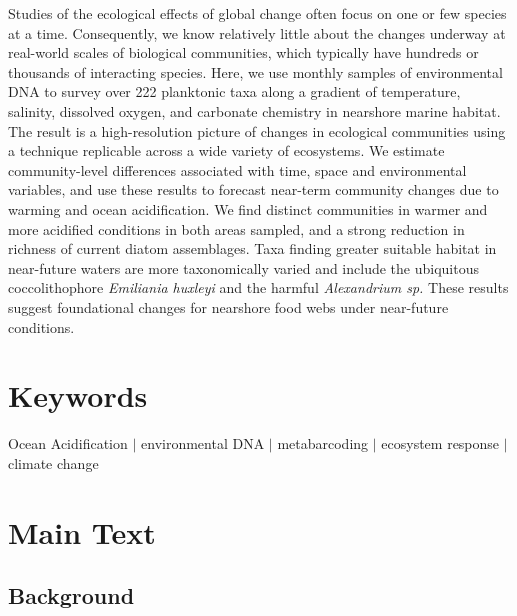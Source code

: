\documentclass[11pt]{article}
\begin{document}
\begin{linenumbers}
Studies of the ecological effects of global change often focus on one or few species at a time. Consequently, we know relatively little about the changes underway at real-world scales of biological communities, which typically have hundreds or thousands of interacting species. Here, we use monthly samples of environmental DNA to survey over 222 planktonic taxa along a gradient of temperature, salinity, dissolved oxygen, and carbonate chemistry in nearshore marine habitat. The result is a high-resolution picture of changes in ecological communities using a technique replicable across a wide variety of ecosystems. We estimate community-level differences associated with time, space and environmental variables, and use these results to forecast near-term community changes due to warming and ocean acidification. We find distinct communities in warmer and more acidified conditions in both areas sampled, and a strong reduction in richness of current diatom assemblages. Taxa finding greater suitable habitat in near-future waters are more taxonomically varied and include the ubiquitous coccolithophore \textit{Emiliania huxleyi} and the harmful \textit{Alexandrium sp.} These results suggest foundational changes for nearshore food webs under near-future conditions.




\section{Keywords}
Ocean Acidification $|$ environmental DNA $|$ metabarcoding $|$ ecosystem response $|$ climate change

\section{Main Text}


\subsection{Background}




\end{linenumbers}
\end{document}
